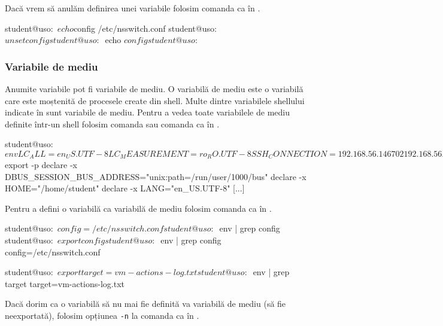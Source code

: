 Dacă vrem să anulăm definirea unei variabile folosim comanda  ca în .

\begin{screen}[caption={Anularea definirii unei variabile},label={lst:cli:unset}]
student@uso:~$ echo $config
/etc/nsswitch.conf
student@uso:~$ unset config
student@uso:~$ echo $config

student@uso:~$
\end{screen}

\subsubsection{Variabile de mediu}
\label{sec:cli:shell-func:vars:env}

Anumite variabile pot fi variabile de mediu. O variabilă de mediu este o
variabilă care este moștenită de procesele create din shell. Multe dintre
variabilele shellului indicate în  sunt variabile de mediu. Pentru
a vedea toate variabilele de mediu definite într-un shell folosim comanda  sau comanda  ca în .

\begin{screen}[caption={Afișarea variabilelor de mediu},label={lst:cli:print-env-vars}]
student@uso:~$ env
LC_ALL=en_US.UTF-8
LC_MEASUREMENT=ro_RO.UTF-8
SSH_CONNECTION=192.168.56.1 46702 192.168.56.101 22
[...]

student@uso:~$ export -p
declare -x DBUS_SESSION_BUS_ADDRESS="unix:path=/run/user/1000/bus"
declare -x HOME="/home/student"
declare -x LANG="en_US.UTF-8"
[...]
\end{screen}

Pentru a defini o variabilă ca variabilă de mediu folosim comanda  ca în .

\begin{screen}[caption={Definirea unei variabile de mediu},label={lst:cli:export}]
student@uso:~$ config=/etc/nsswitch.conf
student@uso:~$ env | grep config
student@uso:~$ export config
student@uso:~$ env | grep config
config=/etc/nsswitch.conf

student@uso:~$ export target=vm-actions-log.txt
student@uso:~$ env | grep target
target=vm-actions-log.txt
\end{screen}

Dacă dorim ca o variabilă să nu mai fie definită va variabilă de mediu (să fie
neexportată), folosim opțiunea \texttt{-n} la comanda  ca în .


